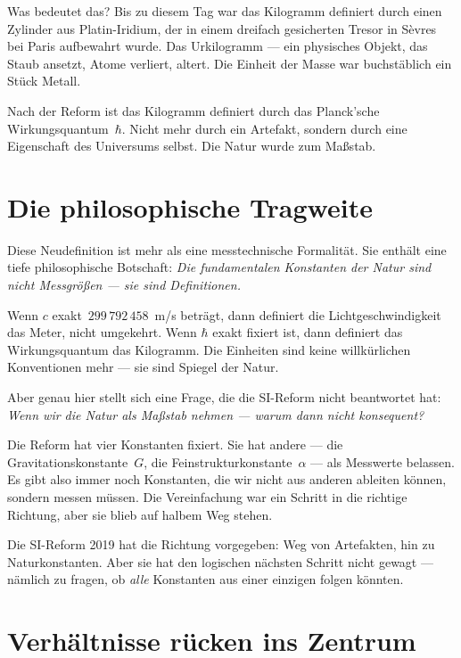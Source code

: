 Was bedeutet das? Bis zu diesem Tag war das Kilogramm definiert durch einen Zylinder aus Platin-Iridium, der in einem dreifach gesicherten Tresor in Sèvres bei Paris aufbewahrt wurde. Das Urkilogramm --- ein physisches Objekt, das Staub ansetzt, Atome verliert, altert. Die Einheit der Masse war buchstäblich ein Stück Metall.

Nach der Reform ist das Kilogramm definiert durch das Planck'sche Wirkungsquantum~$\hbar$. Nicht mehr durch ein Artefakt, sondern durch eine Eigenschaft des Universums selbst. Die Natur wurde zum Maßstab.

\section{Die philosophische Tragweite}

Diese Neudefinition ist mehr als eine messtechnische Formalität. Sie enthält eine tiefe philosophische Botschaft: \emph{Die fundamentalen Konstanten der Natur sind nicht Messgrößen --- sie sind Definitionen.}

Wenn $c$ exakt~$299\,792\,458$~m/s beträgt, dann definiert die Lichtgeschwindigkeit das Meter, nicht umgekehrt. Wenn $\hbar$ exakt fixiert ist, dann definiert das Wirkungsquantum das Kilogramm. Die Einheiten sind keine willkürlichen Konventionen mehr --- sie sind Spiegel der Natur.

Aber genau hier stellt sich eine Frage, die die SI-Reform nicht beantwortet hat: \emph{Wenn wir die Natur als Maßstab nehmen --- warum dann nicht konsequent?}

Die Reform hat vier Konstanten fixiert. Sie hat andere --- die Gravitationskonstante~$G$, die Feinstrukturkonstante~$\alpha$ --- als Messwerte belassen. Es gibt also immer noch Konstanten, die wir nicht aus anderen ableiten können, sondern messen müssen. Die Vereinfachung war ein Schritt in die richtige Richtung, aber sie blieb auf halbem Weg stehen.

\begin{kerngedanke}
Die SI-Reform 2019 hat die Richtung vorgegeben: Weg von Artefakten, hin zu Naturkonstanten. Aber sie hat den logischen nächsten Schritt nicht gewagt --- nämlich zu fragen, ob \emph{alle} Konstanten aus einer einzigen folgen könnten.
\end{kerngedanke}

\section{Verhältnisse rücken ins Zentrum}

